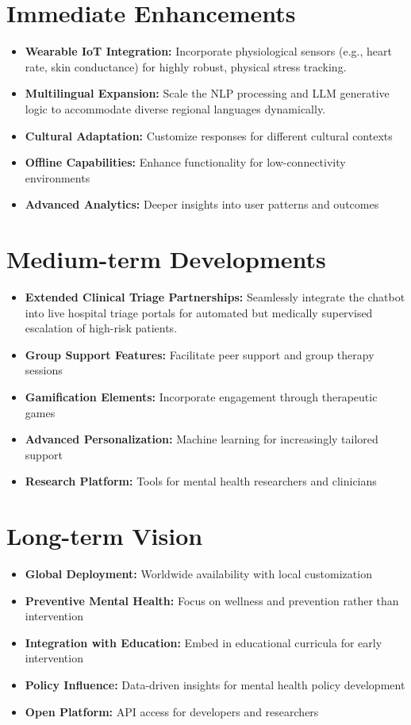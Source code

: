 \documentclass[11pt]{report}
\begin{document}
\section{Immediate Enhancements}
\begin{itemize}
    \item \textbf{Wearable IoT Integration:} Incorporate physiological sensors (e.g., heart rate, skin conductance) for highly robust, physical stress tracking.
    \item \textbf{Multilingual Expansion:} Scale the NLP processing and LLM generative logic to accommodate diverse regional languages dynamically.
    \item \textbf{Cultural Adaptation:} Customize responses for different cultural contexts
    \item \textbf{Offline Capabilities:} Enhance functionality for low-connectivity environments
    \item \textbf{Advanced Analytics:} Deeper insights into user patterns and outcomes
\end{itemize}

\section{Medium-term Developments}
\begin{itemize}
    \item \textbf{Extended Clinical Triage Partnerships:} Seamlessly integrate the chatbot into live hospital triage portals for automated but medically supervised escalation of high-risk patients.
    \item \textbf{Group Support Features:} Facilitate peer support and group therapy sessions
    \item \textbf{Gamification Elements:} Incorporate engagement through therapeutic games
    \item \textbf{Advanced Personalization:} Machine learning for increasingly tailored support
    \item \textbf{Research Platform:} Tools for mental health researchers and clinicians
\end{itemize}

\section{Long-term Vision}
\begin{itemize}
    \item \textbf{Global Deployment:} Worldwide availability with local customization
    \item \textbf{Preventive Mental Health:} Focus on wellness and prevention rather than intervention
    \item \textbf{Integration with Education:} Embed in educational curricula for early intervention
    \item \textbf{Policy Influence:} Data-driven insights for mental health policy development
    \item \textbf{Open Platform:} API access for developers and researchers
\end{itemize}
\end{document}
